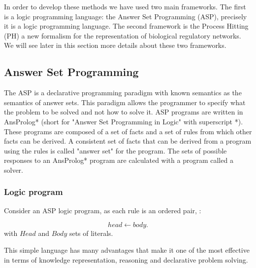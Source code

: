 In order to develop these methods we have used two main frameworks. The first is a logic programming language: the Answer Set Programming (ASP), precisely it is a logic programming language. The second framework is the Process Hitting (PH) a new formalism for the representation of biological regulatory networks. We will see later in this section more details about these two frameworks.

\subsection{Answer Set Programming }

The ASP is a declarative programming paradigm with known semantics as the semantics of answer sets. This paradigm allows the programmer to specify what the problem to be solved and not how to solve it.
ASP programs are written in AnsProlog* (short for "Answer Set Programming in Logic" with superscript *). These programs are composed of a set of facts and a set of rules from which other facts can be derived. A consistent set of facts that can be derived from a program using the rules is called "answer set" for the program. The sets of possible responses to an AnsProlog* program are calculated with a program called a solver.

\subsubsection{Logic program}
Consider an ASP logic program, as each rule is an ordered pair,\cite{baral2003knowledge} :

\begin{equation} \label{eq1ASP}
head \leftarrow body.
\end{equation}
with $Head$ and $Body$ sets of literals. 

This simple language has many advantages that make it one of the most effective in terms of knowledge representation, reasoning and declarative problem solving. 

